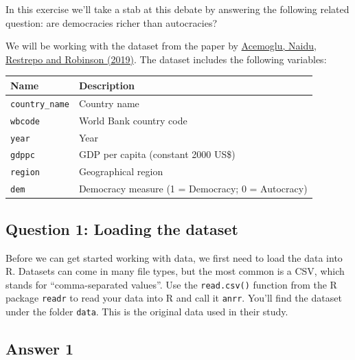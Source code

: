 \documentclass[
  11pt,
  letterpaper]{article}
\begin{document}
In this exercise we'll take a stab at this debate by answering the
following related question: are democracies richer than autocracies?

We will be working with the dataset from the paper by
\href{https://economics.mit.edu/sites/default/files/publications/Democracy\%20Does\%20Cause\%20Growth.pdf}{Acemoglu,
Naidu, Restrepo and Robinson (2019)}. The dataset includes the following
variables:

\begin{longtable}[]{@{}
  >{\raggedright\arraybackslash}p{}
  >{\raggedright\arraybackslash}p{}@{}}
\toprule\noalign{}
\begin{minipage}[b]{\linewidth}\raggedright
Name
\end{minipage} & \begin{minipage}[b]{\linewidth}\raggedright
Description
\end{minipage} \\
\midrule\noalign{}
\endhead
\bottomrule\noalign{}
\endlastfoot
\texttt{country\_name} & Country name \\
\texttt{wbcode} & World Bank country code \\
\texttt{year} & Year \\
\texttt{gdppc} & GDP per capita (constant 2000 US\$) \\
\texttt{region} & Geographical region \\
\texttt{dem} & Democracy measure (1 = Democracy; 0 = Autocracy) \\
\end{longtable}

\subsection{Question 1: Loading the
dataset}\label{question-1-loading-the-dataset}

Before we can get started working with data, we first need to load the
data into R. Datasets can come in many file types, but the most common
is a CSV, which stands for ``comma-separated values''. Use the
\texttt{read.csv()} function from the R package \texttt{readr} to read
your data into R and call it \texttt{anrr}. You'll find the dataset
under the folder \texttt{data}. This is the original data used in their
study.

\subsection{Answer 1}\label{answer-1}
\end{document}
